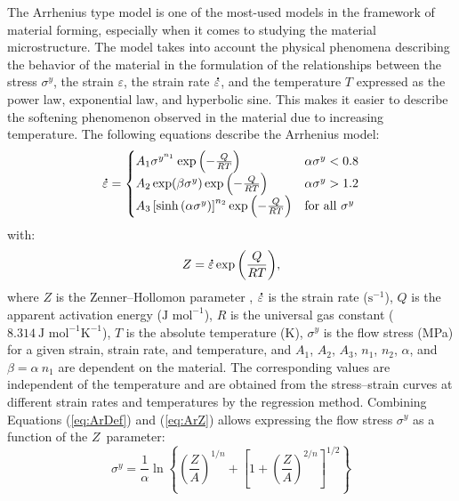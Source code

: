 \documentclass[metals,article,accept,pdftex,moreauthors]{Definitions/mdpi}
\DeclareRobustCommand{\mdot}[1]{\accentset{\mbox{\bfseries .}}{#1}}
\DeclareRobustCommand{\ps}{\text{s}^{-1}}
\begin{document}
The Arrhenius type model \cite{Sellars-1966} is one of the most-used models in the framework of material forming, especially when it comes to studying the material microstructure.
The model takes into account the physical phenomena describing the behavior of the material in the formulation of the relationships between the stress $\sigma^y$, the strain $\varepsilon$, the strain rate $\mdot\varepsilon$, and the temperature $T$ expressed as the power law, exponential law, and hyperbolic sine.
This makes it easier to describe the softening phenomenon observed in the material due to increasing temperature.
The following equations describe the Arrhenius model:
\begin{equation}
\mdot\varepsilon =
\begin{cases}
A_1 \sigma^{y^{n_1}} \exp{\left(-\frac{Q}{RT}\right)} & \alpha\sigma^y < 0.8\\
A_2 \exp(\beta\sigma^y) \exp{\left(-\frac{Q}{RT}\right)} & \alpha\sigma^y > 1.2\\
A_3 \left[\sinh{\left(\alpha\sigma^y\right)}\right]^{n_2} \exp{\left(-\frac{Q}{RT}\right)} & \text{for all }\sigma^y
\end{cases}
\label{eq:ArDef}
\end{equation}
with:
\begin{equation}
Z = \mdot\varepsilon \exp{\left(\frac{Q}{RT}\right)}, \label{eq:ArZ}
\end{equation}
where $Z$ is the Zenner--Hollomon parameter \cite{Zener-1944}, $\mdot\varepsilon$ is the strain rate ($\ps$), $Q$ is the apparent activation energy ($\text{J~mol}^{-1}$), $R$ is the universal gas constant ($8.314~\text{J~mol}^{-1} \text{K}^{-1}$), $T$ is the absolute temperature (K), $\sigma^y$ is the flow stress (MPa) for a given strain, strain rate, and temperature, and $A_1$, $A_2$, $A_3$, $n_1$, $n_2$, $\alpha$, and $\beta=\alpha~n_1$ are dependent on the material.
The corresponding values are independent of the temperature and are obtained from the stress--strain curves at different strain rates and temperatures by the regression method.
Combining Equations (\ref{eq:ArDef}) and (\ref{eq:ArZ}) allows expressing the flow stress $\sigma^y$ as a function of the $Z$~parameter:
\begin{equation}
\sigma^y = \frac{1}{\alpha} \ln\left\{\left(\frac{Z}{A}\right)^{1/n} + \left[1 + \left(\frac{Z}{A}\right)^{2/n}\right]^{1/2}\right\}
\end{equation}
\end{document}
